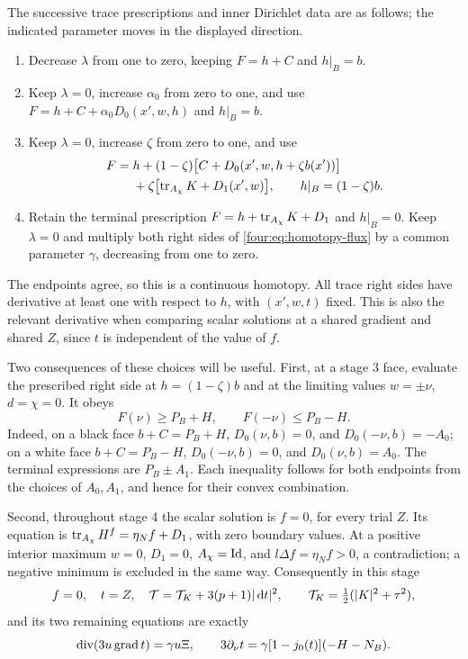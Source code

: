 The successive trace prescriptions and inner Dirichlet data are as
follows; the indicated parameter moves in the displayed direction.
\begin{enumerate}[label=\textup{Stage \arabic*:},leftmargin=*]
\item Decrease $\lambda$ from one to zero, keeping
      $F=h+C$ and $h|_B=b$.
\item Keep $\lambda=0$, increase $\alpha_0$ from zero to one, and use
      $F=h+C+\alpha_0D_0(x',w,h)$ and $h|_B=b$.
\item Keep $\lambda=0$, increase $\zeta$ from zero to one, and use
\begin{equation}\label{four:sys:trace-prescriptions}
\begin{aligned}
 F={}&h+(1-\zeta)\bigl[C+D_0(x',w,h+\zeta b(x'))\bigr]\\
    &+\zeta\bigl[\operatorname{tr}_{A_\chi}K+D_1(x',w)\bigr],
 \qquad h|_B=(1-\zeta)b.
\end{aligned}
\end{equation}
\item Retain the terminal prescription
      $F=h+\operatorname{tr}_{A_\chi}K+D_1$ and $h|_B=0$.  Keep $\lambda=0$ and
      multiply both right sides of \eqref{four:eq:homotopy-flux} by a common
      parameter $\gamma$, decreasing from one to zero.
\end{enumerate}
The endpoints agree, so this is a continuous homotopy.  All trace right
sides have derivative at least one with respect to $h$, with $(x',w,t)$
fixed.  This is also the relevant derivative when comparing scalar
solutions at a shared gradient and shared $Z$, since $t$ is independent
of the value of $f$.

Two consequences of these choices will be useful.  First, at a stage 3
face, evaluate the prescribed right side at $h=(1-\zeta)b$ and at the
limiting values $w=\pm\nu$, $d=\chi=0$.  It obeys
\begin{equation}\label{four:sys:direction-inequalities}
 F(\nu)\ge P_B+H,\qquad F(-\nu)\le P_B-H.
\end{equation}
Indeed, on a black face $b+C=P_B+H$, $D_0(\nu,b)=0$, and
$D_0(-\nu,b)=-A_0$; on a white face $b+C=P_B-H$,
$D_0(-\nu,b)=0$, and $D_0(\nu,b)=A_0$.  The terminal expressions are
$P_B\pm A_1$.  Each inequality follows for both endpoints from the
choices of $A_0,A_1$, and hence for their convex combination.

Second, throughout stage 4 the scalar solution is $f=0$, for every trial
$Z$.  Its equation is
$\operatorname{tr}_{A_\chi}H^f=\eta_N f+D_1$, with zero boundary values.  At a
positive interior maximum $w=0$, $D_1=0$, $A_\chi=\operatorname{Id}$, and
$l\Delta f=\eta_N f>0$, a contradiction; a negative minimum is
excluded in the same way.  Consequently in this stage
\begin{equation}\label{four:sys:terminal-system}
 f=0,\quad t=Z,\quad
 \mathcal T=\mathcal T_K+3(p+1)|\,\mathrm d t|^2,\qquad
 \mathcal T_K=\tfrac12(|K|^2+\tau^2),
\end{equation}
and its two remaining equations are exactly
\[
 \operatorname{div}(3u\operatorname{grad} t)=\gamma u\Xi,\qquad
 3\partial_\nu t=\gamma[1-j_0(t)](-H-N_B).
\]

